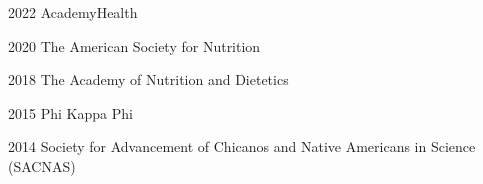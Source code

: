 




\begin{cvpms}

 \cvpm
    {2022} %
    {AcademyHealth} 

 \cvpm
    {2020} %
    {The American Society for Nutrition} 

 \cvpm
    {2018} %
    {The Academy of Nutrition and Dietetics} 

  \cvpm
    {2015} %
    {Phi Kappa Phi} 
    
  \cvpm
    {2014} %
    {Society for Advancement of Chicanos and Native Americans in Science (SACNAS)} 

\end{cvpms}

